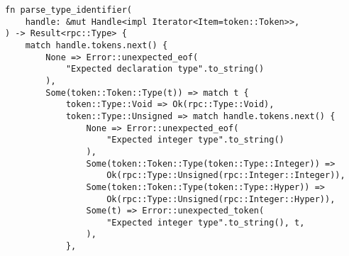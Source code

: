 \begin{lstlisting}[caption={Разбор типа (часть 1)}, label={lst:rust_parser_type1}]
fn parse_type_identifier(
    handle: &mut Handle<impl Iterator<Item=token::Token>>,
) -> Result<rpc::Type> {
    match handle.tokens.next() {
        None => Error::unexpected_eof(
            "Expected declaration type".to_string()
        ),
        Some(token::Token::Type(t)) => match t {
            token::Type::Void => Ok(rpc::Type::Void),
            token::Type::Unsigned => match handle.tokens.next() {
                None => Error::unexpected_eof(
                    "Expected integer type".to_string()
                ),
                Some(token::Token::Type(token::Type::Integer)) =>
                    Ok(rpc::Type::Unsigned(rpc::Integer::Integer)),
                Some(token::Token::Type(token::Type::Hyper)) =>
                    Ok(rpc::Type::Unsigned(rpc::Integer::Hyper)),
                Some(t) => Error::unexpected_token(
                    "Expected integer type".to_string(), t,
                ),
            },
\end{lstlisting}
\clearpage
